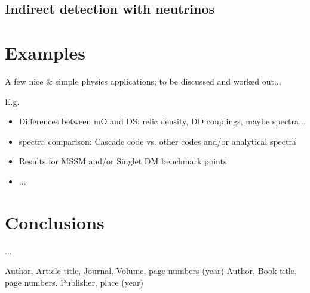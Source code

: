 \subsection{Indirect detection with neutrinos}
\label{code_nu}



\section{Examples}
\label{examples}

A few nice \& simple physics applications; to be discussed and worked out...

E.g.
\begin{itemize}
\item Differences between mO and DS: relic density, DD couplings, maybe spectra...
\item spectra comparison: Cascade code vs. other codes and/or analytical spectra
\item Results for MSSM and/or Singlet DM benchmark points
\item  ...
\end{itemize}

\section{Conclusions}
\label{conc}


\begin{acknowledgements}
...
\end{acknowledgements}



\begin{thebibliography}{}
%
%
Author, Article title, Journal, Volume, page numbers (year)
Author, Book title, page numbers. Publisher, place (year)
\end{thebibliography}



